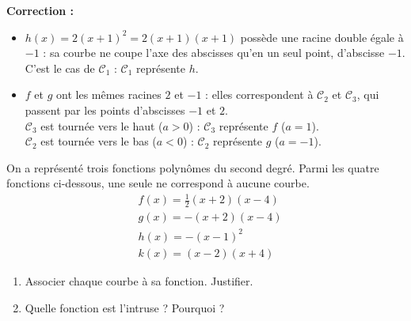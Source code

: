 \documentclass[11pt,a4paper]{book}
\begin{document}
\medskip
\noindent\textbf{\color{red!75!black}Correction :}

\smallskip
\begin{corrBox}
	\begin{itemize}
		\item $h(x)=2(x+1)^2=2(x+1)(x+1)$ possède une racine double égale à $-1$ : sa courbe ne coupe l'axe des abscisses qu'en un seul point, d'abscisse $-1$.\\
		C'est le cas de $\mathcal{C}_1$ : $\mathcal{C}_1$ représente $h$.
		\item $f$ et $g$ ont les mêmes racines $2$ et $-1$ : elles correspondent à $\mathcal{C}_2$ et $\mathcal{C}_3$, qui passent par les points d'abscisses $-1$ et $2$.\\
		$\mathcal{C}_3$ est tournée vers le haut ($a>0$) : $\mathcal{C}_3$ représente $f$ ($a=1$).\\
		$\mathcal{C}_2$ est tournée vers le bas ($a<0$) : $\mathcal{C}_2$ représente $g$ ($a=-1$).
	\end{itemize}
\end{corrBox}

\exerciceDS{}

\begin{minipage}[c]{0.40\linewidth}
	On a représenté trois fonctions polynômes du second degré. Parmi les quatre fonctions ci-dessous, une seule ne correspond à aucune courbe.
	$$
	\begin{aligned}
		& f(x)=\frac{1}{2}(x+2)(x-4) \\
		& g(x)=-(x+2)(x-4) \\
		& h(x)=-(x-1)^{2} \\
		& k(x)=(x-2)(x+4)
	\end{aligned}
	$$
	\begin{enumerate}[label=\textbf{\arabic*)}]
		\item Associer chaque courbe à sa fonction. Justifier.
		\item Quelle fonction est l'intruse ? Pourquoi ?
	\end{enumerate}
\end{minipage} \hfill
\begin{minipage}[c]{0.56\linewidth}
	\begin{center}
	\end{center}
\end{minipage}
\end{document}
